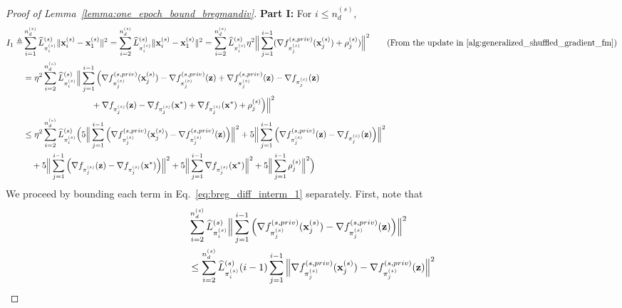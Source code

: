 \begin{proof}[Proof of Lemma~\ref{lemma:one_epoch_bound_bregmandiv}]
    \textbf{Part I: } For $i \leq n_d^{(s)}$,
    \begin{align}
        I_1 \triangleq &\sum_{i=1}^{n_d^{(s)}} \widehat{L}_{\pi_i^{(s)}}^{(s)} \|\rvx_i^{(s)} - \rvx_1^{(s)}\|^2
        = \sum_{i=2}^{n_d^{(s)}} \widehat{L}_{\pi_i^{(s)}}^{(s)} \|\rvx_i^{(s)} - \rvx_1^{(s)}\|^2
        = \sum_{i=2}^{n_d^{(s)}} \widehat{L}_{\pi_i^{(s)}}^{(s)} \eta^2 \Big\| \sum_{j=1}^{i-1} (\nabla f_{\pi_j^{(s)}}^{(s, priv)}(\rvx_j^{(s)}) + \rho_j^{(s)})  \Big\|^2 \tag{From the update in \Cref{alg:generalized_shuffled_gradient_fm}}\\
        &= \eta^2 \sum_{i=2}^{n_d^{(s)}} \widehat{L}_{\pi_i^{(s)}}^{(s)} \Big\| \sum_{j=1}^{i-1} \Big(\nabla f_{\pi_j^{(s)}}^{(s, priv)}(\rvx_j^{(s)}) 
        - \nabla f_{\pi_j^{(s)}}^{(s, priv)}(\rvz) + \nabla f_{\pi_j^{(s)}}^{(s, priv)}(\rvz)
        - \nabla f_{\pi_j^{(s)}}(\rvz) \\
        \nonumber
        &\qquad \qquad \qquad \qquad + \nabla f_{\pi_j^{(s)}}(\rvz) - \nabla f_{\pi_j^{(s)}}(\rvx^*)
        + \nabla f_{\pi_j^{(s)}}(\rvx^*) + \rho_j^{(s)}
        \Big)\Big\|^2 \\
    \label{eq:breg_diff_interm_1}
        &\leq \eta^2 \sum_{i=2}^{n_d^{(s)}} \widehat{L}_{\pi_i^{(s)}}^{(s)}\Big(
            5\Big\| \sum_{j=1}^{i-1} \Big(\nabla f_{\pi_j^{(s)}}^{(s, priv)}(\rvx_j^{(s)}) - \nabla f_{\pi_j^{(s)}}^{(s, priv)}(\rvz) \Big) \Big\|^2
            + 5\Big\| \sum_{j=1}^{i-1}\Big( \nabla f_{\pi_j^{(s)}}^{(s, priv)}(\rvz) - \nabla f_{\pi_j^{(s)}}(\rvz) \Big) \Big\|^2\\
        \nonumber
            &\quad + 5 \Big\|\sum_{j=1}^{i-1} \Big( \nabla f_{\pi_j^{(s)}}(\rvz) - \nabla f_{\pi_j^{(s)}}(\rvx^*) \Big) \Big\|^2
            + 5\Big\| \sum_{j=1}^{i-1} \nabla f_{\pi_j^{(s)}}(\rvx^*) \Big\|^2
            + 5\Big\| \sum_{j=1}^{i-1}\rho_j^{(s)} \Big\|^2
        \Big)
    \end{align}
    We proceed by bounding each term in Eq.~\ref{eq:breg_diff_interm_1} separately. First, note that
    \begin{align}
        &\sum_{i=2}^{n_d^{(s)}} \widehat{L}_{\pi_i^{(s)}}^{(s)}\Big\|\sum_{j=1}^{i-1} \Big( \nabla f_{\pi_j^{(s)}}^{(s, priv)}(\rvx_j^{(s)}) - \nabla f_{\pi_j^{(s)}}^{(s, priv)}(\rvz) \Big)\Big\|^2\\
        \nonumber
        &\leq \sum_{i=2}^{n_d^{(s)}} \widehat{L}_{\pi_i^{(s)}}^{(s)} (i-1)\sum_{j=1}^{i-1} \Big\| \nabla f_{\pi_j^{(s)}}^{(s, priv)}(\rvx_j^{(s)}) - \nabla f_{\pi_j^{(s)}}^{(s, priv)}(\rvz) \Big\|^2\\

\end{align}
\end{proof}

